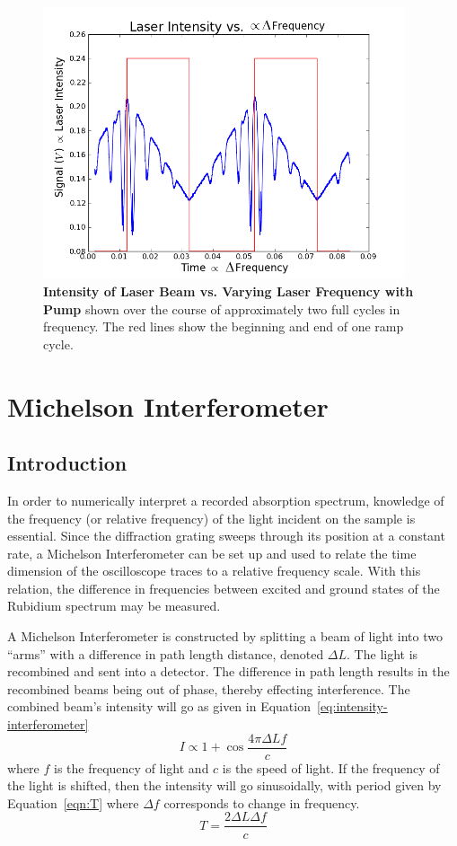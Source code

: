 \documentclass[paper=a4, fontsize=11pt]{scrartcl} %
\numberwithin{equation}{section}
\numberwithin{figure}{section}
\numberwithin{table}{section}
\begin{document}
\begin{figure}[h] \begin{center}
  \includegraphics[height=80mm]{2-2-002.png}
  \caption{\textbf{Intensity of Laser Beam vs. Varying Laser Frequency
      with Pump} shown over the course of approximately two full
    cycles in frequency. The red lines show the beginning and end of
    one ramp cycle.}
  \label{fig:absorb2}
\end{center} \end{figure}

\section{Michelson Interferometer}

\subsection{Introduction}

In order to numerically interpret a recorded absorption spectrum, knowledge of the frequency (or relative frequency) of the light incident on the sample is essential. Since the diffraction grating sweeps through its position
at a constant rate, a Michelson Interferometer can be set up and used to relate the time dimension of the oscilloscope traces to a relative frequency scale. With this relation, the difference in frequencies between excited and ground states of the Rubidium spectrum may be measured.

A Michelson Interferometer is constructed by splitting a beam of light
into two ``arms'' with a difference in path length distance, denoted $\Delta L$. The light is recombined and sent into a detector. The difference in path length results in the recombined beams being out of phase, thereby effecting interference. The combined beam's intensity will go as given in Equation~\ref{eq:intensity-interferometer}
\begin{equation}
\label{eq:intensity-interferometer}
I \propto 1 + \cos \frac{4\pi \Delta Lf}{c}
\end{equation}
where $f$ is the frequency of light and $c$ is the speed of light. If
the frequency of the light is shifted, then the intensity will go sinusoidally, with period given by Equation~\ref{eqn:T} where $\Delta f$ corresponds to change in frequency.
\begin{equation}
\label{eqn:T}
T = \frac{2\Delta L \Delta f}{c}
\end{equation}
\end{document}
